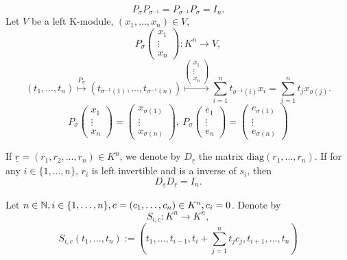 \begin{box2}
    $$P_\sigma P_{\sigma^{-1}}=P_{\sigma^{-1}}P_\sigma=I_{n}.$$
    Let $V$ be a left K-module, $(x_1,\dots,x_n)\in V$,
    $$P_\sigma\begin{pmatrix}
 x_1\\
 \vdots\\
x_n
\end{pmatrix}
:K^n\longrightarrow V,$$
$$(t_1,\dots,t_n)\overset{P_\sigma}{\longmapsto}(t_{\sigma^{-1}(1)},\dots,t_{\sigma^{-1}(n)})\overset{\begin{pmatrix}
 x_1\\
 \vdots\\
x_n
\end{pmatrix}}{\longmapsto}\sum_{i=1}^{n}t_{\sigma^{-1}(i)}x_i=\sum_{j=1}^{n}t_jx_{\sigma(j)}.$$
$$P_\sigma\begin{pmatrix}
    x_1\\
    \vdots\\
    x_n
\end{pmatrix}=\begin{pmatrix}
    x_{\sigma(1)}\\
    \vdots\\
    x_{\sigma(n)}
\end{pmatrix},\ P_\sigma\begin{pmatrix}
    e_1\\
    \vdots\\
    e_n
\end{pmatrix}=\begin{pmatrix}
    e_{\sigma(1)}\\
    \vdots\\
    e_{\sigma(n)}
\end{pmatrix}$$
\end{box2}
\begin{definitionenv}
    If $\underline{r}=(r_1,r_2,\dots,r_n)\in K^n$, we denote by $D_{\underline{r}}$ the matrix $\mathrm{diag}(r_1,\dots,r_n)$.
    If for any $i\in \{1,\dots,n\}$, $r_i$ is left invertible and is a inverse of $s_i$, then 
    $$D_{\underline{s}}D_{\underline{r}}=I_n.$$
\end{definitionenv}
\begin{definitionenv}
    Let $n\in \mathbb{N}, i\in \{1,\dots,n\},c=\left(c_1,\dots,c_n\right)\in K^n,c_i=0$. Denote by 
    $$S_{i,c}:K^n\longrightarrow K^n,$$
    $$S_{i,c}(t_1,\dots,t_n):=\left(t_1,\dots,t_{i-1},t_i+\sum_{j=1}^{n}t_jc_j,t_{i+1},\dots,t_n\right)$$
\end{definitionenv}
